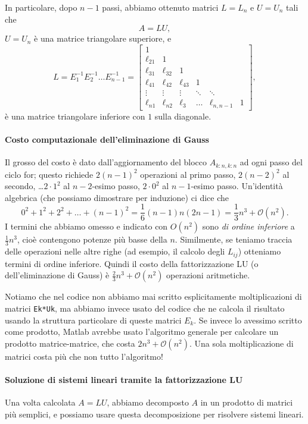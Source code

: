 \documentclass[a4paper]{report}
\theoremstyle{definiton}
\theoremstyle{remark}
\begin{document}
In particolare, dopo $n-1$ passi, abbiamo ottenuto matrici $L=L_n$ e $U=U_n$ tali che
\[
A = L U,
\]
$U = U_n$ è una matrice triangolare superiore, e 
\[
L = E_1^{-1}E_2^{-1}\dots E_{n-1}^{-1} = \begin{bmatrix}
    1\\
    \ell_{21} & 1\\
    \ell_{31} & \ell_{32} & 1\\
    \ell_{41} & \ell_{42} & \ell_{43} & 1\\
    \vdots & \vdots & \vdots & \ddots & \ddots\\
    \ell_{n1} & \ell_{n2} & \ell_3 & \dots & \ell_{n,n-1} & 1
\end{bmatrix},
\]
è una matrice triangolare inferiore con $1$ sulla diagonale.

\paragraph{Costo computazionale dell'eliminazione di Gauss}

Il grosso del costo è dato dall'aggiornamento del blocco $A_{k:n, k:n}$ ad ogni passo del ciclo for; questo richiede $2(n-1)^2$ operazioni al primo passo, $2(n-2)^2$ al secondo, \dots $2\cdot 1^2$ al $n-2$-esimo passo, $2\cdot 0^2$ al $n-1$-esimo passo. Un'identità algebrica (che possiamo dimostrare per induzione) ci dice che
\[
0^2+1^2 + 2^2 + \dots + (n-1)^2 = \frac{1}{6}(n-1)n(2n-1) = \frac13n^3 + \mathcal{O}(n^2).
\]
I termini che abbiamo omesso e indicato con $O(n^2)$ sono \emph{di ordine inferiore} a $\frac13 n^3$, cioè contengono potenze più basse della $n$. Similmente, se teniamo traccia delle operazioni nelle altre righe (ad esempio, il calcolo degli $L_{ij}$) otteniamo termini di ordine inferiore. Quindi il costo della fattorizzazione LU (o dell'eliminazione di Gauss) è $\frac23 n^3 + \mathcal{O}(n^2)$ operazioni aritmetiche.

Notiamo che nel codice non abbiamo mai scritto esplicitamente moltiplicazioni di matrici \lstinline{Ek*Uk}, ma abbiamo invece usato del codice che ne calcola il risultato usando la struttura particolare di queste matrici $E_k$. Se invece lo avessimo scritto come prodotto, Matlab avrebbe usato l'algoritmo generale per calcolare un prodotto matrice-matrice, che costa $2n^3 + \mathcal{O}(n^2)$. Una sola moltiplicazione di matrici costa più che non tutto l'algoritmo!

\paragraph{Soluzione di sistemi lineari tramite la fattorizzazione LU} 
Una volta calcolata $A = LU$, abbiamo decomposto $A$ in un prodotto di matrici più semplici, e possiamo usare questa decomposizione per risolvere sistemi lineari. 
\end{document}
